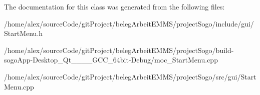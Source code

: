 The documentation for this class was generated from the following files\-:\begin{DoxyCompactItemize}
\item 
/home/alex/source\-Code/git\-Project/beleg\-Arbeit\-E\-M\-M\-S/project\-Sogo/include/gui/Start\-Menu.\-h\item 
/home/alex/source\-Code/git\-Project/beleg\-Arbeit\-E\-M\-M\-S/project\-Sogo/build-\/sogo\-App-\/\-Desktop\-\_\-\-Qt\-\_\-\_\-\_\-\_\-\-G\-C\-C\-\_\-64bit-\/\-Debug/moc\-\_\-\-Start\-Menu.\-cpp\item 
/home/alex/source\-Code/git\-Project/beleg\-Arbeit\-E\-M\-M\-S/project\-Sogo/src/gui/Start\-Menu.\-cpp\end{DoxyCompactItemize}
